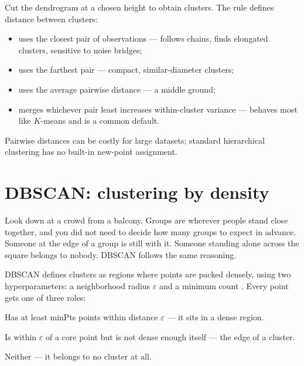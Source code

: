 Cut the dendrogram at a chosen height to obtain clusters. The  rule defines distance between clusters:

\begin{itemize}
  \item {} uses the closest pair of observations --- follows chains, finds elongated clusters, sensitive to noise bridges;
  \item {} uses the farthest pair --- compact, similar-diameter clusters;
  \item {} uses the average pairwise distance --- a middle ground;
  \item {} merges whichever pair least increases within-cluster variance --- behaves most like $K$-means and is a common default.
\end{itemize}

Pairwise distances can be costly for large datasets; standard hierarchical clustering has no built-in new-point assignment.

\section{DBSCAN: clustering by density}
\label{sec:dbscan}

\begin{analogy}
Look down at a crowd from a balcony. Groups are wherever people stand close together, and you did not need to decide how many groups to expect in advance. Someone at the edge of a group is still with it. Someone standing alone across the square belongs to nobody. DBSCAN follows the same reasoning.
\end{analogy}

DBSCAN defines clusters as regions where points are packed densely, using two hyperparameters: a neighborhood radius $\varepsilon$ and a minimum count . Every point gets one of three roles:

\begin{description}[leftmargin=1.05in,style=nextline]
  \item[Core point] Has at least minPts points within distance $\varepsilon$ --- it sits in a dense region.
  \item[Border point] Is within $\varepsilon$ of a core point but is not dense enough itself --- the edge of a cluster.
  \item[Noise point] Neither --- it belongs to no cluster at all.
\end{description}

